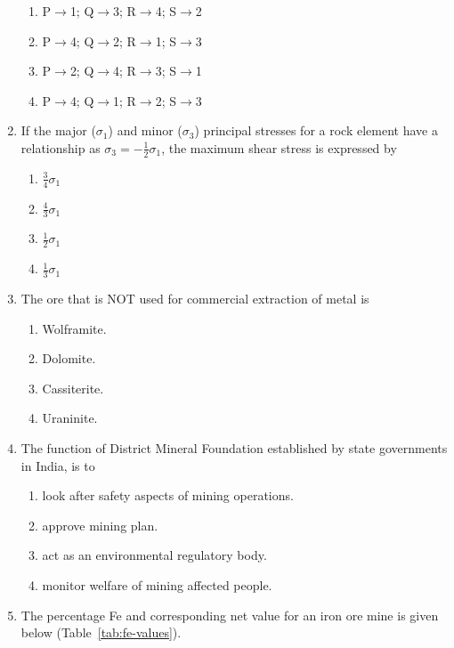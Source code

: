 \documentclass[journal]{IEEEtran}
\begin{document}
\begin{enumerate}[leftmargin=0pt]


\begin{enumerate}
\item P$\to$1; Q$\to$3; R$\to$4; S$\to$2\\[0.5em]
\item P$\to$4; Q$\to$2; R$\to$1; S$\to$3\\[0.5em]
\item P$\to$2; Q$\to$4; R$\to$3; S$\to$1\\[0.5em]
\item P$\to$4; Q$\to$1; R$\to$2; S$\to$3\\[0.5em]
\end{enumerate}
\hfill{}

\item If the major ($\sigma_1$) and minor ($\sigma_3$) principal stresses for a rock element have a relationship as $\sigma_3 = -\frac{1}{2} \sigma_1$, the maximum shear stress is expressed by
\begin{enumerate}
\item $\frac{3}{4}\sigma_1$\\[0.5em]
\item $\frac{4}{3}\sigma_1$\\[0.5em]
\item $\frac{1}{2}\sigma_1$\\[0.5em]
\item $\frac{1}{3}\sigma_1$\\[0.5em]
\end{enumerate}
\hfill{}
\item The ore that is NOT used for commercial extraction of metal is
\begin{enumerate}
\item Wolframite.
\item Dolomite.
\item Cassiterite.
\item Uraninite.
\end{enumerate}
\hfill{}
\item The function of District Mineral Foundation established by state governments in India, is to
\begin{enumerate}
\item look after safety aspects of mining operations.
\item approve mining plan.
\item act as an environmental regulatory body.
\item monitor welfare of mining affected people.
\end{enumerate}
\hfill{}
\item The percentage Fe and corresponding net value for an iron ore mine is given below
(Table~\ref{tab:fe-values}).


\end{enumerate}
\end{document}
